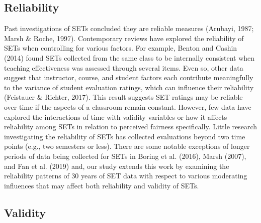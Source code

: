 \documentclass[
  man]{apa7}
\begin{document}
\hypertarget{reliability}{%
\subsection{Reliability}\label{reliability}}

Past investigations of SETs concluded they are reliable measures
(Arubayi, 1987; Marsh \& Roche, 1997). Contemporary reviews have explored the
reliability of SETs when controlling for various factors. For example,
Benton and Cashin (2014) found SETs collected from the same class to be internally
consistent when teaching effectiveness was assessed through several
items. Even so, other data suggest that instructor, course, and student
factors each contribute meaningfully to the variance of student
evaluation ratings, which can influence their reliability
(Feistauer \& Richter, 2017). This result suggests SET ratings may be reliable over
time if the aspects of a classroom remain constant. However, few data
have explored the interactions of time with validity variables or how it
affects reliability among SETs in relation to perceived fairness
specifically. Little research investigating the reliability of SETs has
collected evaluations beyond two time points (e.g., two semesters or
less). There are some notable exceptions of longer periods of data being
collected for SETs in Boring et al. (2016), Marsh (2007), and Fan et al. (2019) and, our study extends this work by examining the reliability patterns of 30 years of SET data with respect to various moderating influences that may affect both reliability and validity of SETs.

\hypertarget{validity}{%
\subsection{Validity}\label{validity}}
\end{document}
